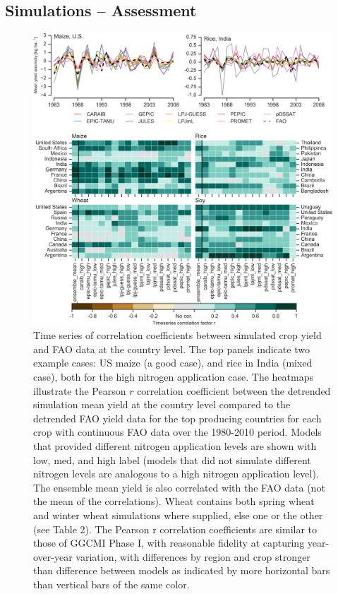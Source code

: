 \documentclass[esd, manuscript]{copernicus} %
\begin{document}

\appendix
\section{}
\subsection{Simulations -- Assessment}
\label{A:1}

\begin{figure}[t]
    \centering
    \includegraphics[width=15cm]{figures/Agformet_validation.png}
    \caption{Time series of correlation coefficients between simulated crop yield and FAO data \citep{FAOSTAT} at the country level. The top panels indicate two example cases: US maize (a good case), and rice in India (mixed case), both for the high nitrogen application case. The heatmaps illustrate the Pearson $r$ correlation coefficient between the detrended simulation mean yield at the country level compared to the detrended FAO yield data for the top producing countries for each crop with continuous FAO data over the 1980-2010 period. Models that provided different nitrogen application levels are shown with low, med, and high label (models that did not simulate different nitrogen levels are analogous to a high nitrogen application level). The ensemble mean yield is also correlated with the FAO data (not the mean of the correlations). Wheat contains both spring wheat and winter wheat simulations where supplied, else one or the other (see Table 2). The Pearson r correlation coefficients are similar to those of GGCMI Phase I, with reasonable fidelity at capturing year-over-year variation, with differences by region and crop stronger than difference between models as indicated by more horizontal bars than vertical bars of the same color.}

\end{figure}
\end{document}
